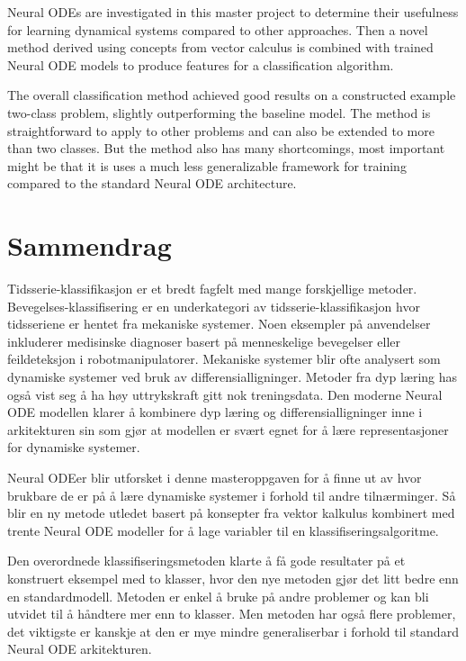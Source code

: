 \documentclass[12pt,a4paper]{book}
\begin{document}
Neural ODEs are investigated in this master project to determine their usefulness for learning dynamical systems compared to other approaches. Then a novel method derived using concepts from vector calculus is combined with trained Neural ODE models to produce features for a classification algorithm.

The overall classification method achieved good results on a constructed example two-class problem, slightly outperforming the baseline model. The method is straightforward to apply to other problems and can also be extended to more than two classes. But the method also has many shortcomings, most important might be that it is uses a much less generalizable framework for training compared to the standard Neural ODE architecture.

\clearpage

\section*{Sammendrag}

\vspace{1cm}

Tidsserie-klassifikasjon er et bredt fagfelt med mange forskjellige metoder. Bevegelses-klassifisering er en underkategori av tidsserie-klassifikasjon hvor tidsseriene er hentet fra mekaniske systemer. Noen eksempler på anvendelser inkluderer medisinske diagnoser basert på menneskelige bevegelser eller feildeteksjon i robotmanipulatorer. Mekaniske systemer blir ofte analysert som dynamiske systemer ved bruk av differensialligninger. Metoder fra dyp læring has også vist seg å ha høy uttrykskraft gitt nok treningsdata. Den moderne Neural ODE modellen klarer å kombinere dyp læring og differensialligninger inne i arkitekturen sin som gjør at modellen er svært egnet for å lære representasjoner for dynamiske systemer.

Neural ODEer blir utforsket i denne masteroppgaven for å finne ut av hvor brukbare de er på å lære dynamiske systemer i forhold til andre tilnærminger. Så blir en ny metode utledet basert på konsepter fra vektor kalkulus kombinert med trente Neural ODE modeller for å lage variabler til en klassifiseringsalgoritme.

Den overordnede klassifiseringsmetoden klarte å få gode resultater på et konstruert eksempel med to klasser, hvor den nye metoden gjør det litt bedre enn en standardmodell. Metoden er enkel å bruke på andre problemer og kan bli utvidet til å håndtere mer enn to klasser. Men metoden har også flere problemer, det viktigste er kanskje at den er mye mindre generaliserbar i forhold til standard Neural ODE arkitekturen.
\end{document}
